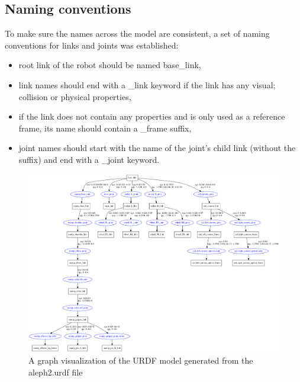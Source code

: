 \documentclass[english,inz,shortabstract]{iithesis}
\begin{document}
    \subsection{Naming conventions}

        To make sure the names across the model are consistent, a set of naming conventions for links and joints was established:

        \begin{itemize} 
            \item root link of the robot should be named \textsf{base\_link},
            \item link names should end with a \textsf{\_link} keyword if the link has any visual; collision or physical properties,
            \item if the link does not contain any properties and is only used as a reference frame, its name should contain a \textsf{\_frame} suffix,
            \item joint names should start with the name of the joint's child link (without the suffix) and end with a \textsf{\_joint} keyword.
        \end{itemize}

        \begin{figure}[ht]
            \centering
            \captionsetup{margin=2cm}
            \includegraphics[width=\textwidth]{img/aleph2_description.pdf}
            \caption{A graph visualization of the URDF model generated from the \textsf{aleph2.urdf} file}
            \label{fig:aleph2_description}
        \end{figure}

\pagebreak
\end{document}
